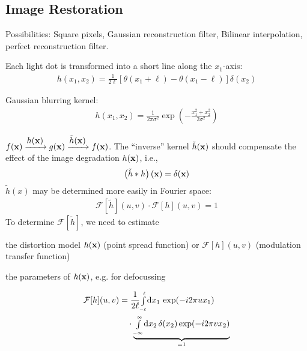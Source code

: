 \begin{compactdesc}
\section{Image Restoration}
	\item[\lp{Pixelization}]
		Possibilities: Square pixels, Gaussian reconstruction filter, Bilinear interpolation, perfect reconstruction filter.
	\item[\lp{Motion blurring}] Each light dot is transformed into a short line along the $x_1$-axis:
		\begin{gather*}
			h(x_1,x_2)=\frac{1}{2\ell}\left[ \theta(x_1+\ell)-\theta(x_1-\ell) \right]\delta(x_2)
		\end{gather*}
	\item[\lp{Noise}] Gaussian blurring kernel:
		\begin{gather*}
			h(x_1,x_2)=\frac{1}{2\pi\sigma^2}\exp\!\left( -\frac{x_{1}^{2}+x_{2}^{2}}{2\sigma^2} \right)
		\end{gather*}
	\item[\lp{Problem}] $f(\boldsymbol{\mathrm{x}})\xrightarrow{\displaystyle h(\boldsymbol{\mathrm{x}})}g(\boldsymbol{\mathrm{x}})\xrightarrow{\displaystyle\tilde{h}(\boldsymbol{\mathrm{x}})}f(\boldsymbol{\mathrm{x}})$. The ``inverse'' kernel $\tilde{h}(\boldsymbol{\mathrm{x}})$ should compensate the effect of  the image degradation $h(\boldsymbol{\mathrm{x}})$, i.e.,
		\begin{gather*}
			\left( \tilde{h}*h \right)(\boldsymbol{\mathrm{x}})=\delta(\boldsymbol{\mathrm{x}})
		\end{gather*}
		$\tilde{h}(x)$ may be determined more easily in Fourier space:
		\begin{gather*}
			\mathcal{F}\!\left[ \tilde{h} \right]\!(u,v)\cdot\mathcal{F}[h](u,v)=1
		\end{gather*}
		To determine $\mathcal{F}\!\left[ \tilde{h} \right]\!$, we need to estimate
		\begin{inparaenum}[\itshape(1)]
			\item the distortion model $h(\boldsymbol{\mathrm{x}})$ (point spread function) or $\mathcal{F}[h](u,v)$ (modulation transfer function)
			\item the parameters of $h(\boldsymbol{\mathrm{x}})$, e.g. for defocussing
		\end{inparaenum}
	\item[\lp{Motion Blur FT}] 
		\begin{align*}
			\mathcal{F}[h](u,v)&=\frac{1}{2\ell}{\scriptstyle\int\limits_{-\ell}^{\ell}}\rd x_1\, \exp\!\left( -i2\pi ux_1 \right)\\
			&\quad\cdot\underbrace{{\scriptstyle\int\limits_{-\infty}^{\infty}}\rd x_2\, \delta(x_2)\exp\!\left( -i2\pi vx_2 \right)}_{=1}\\

\end{align*}
\end{compactdesc}
